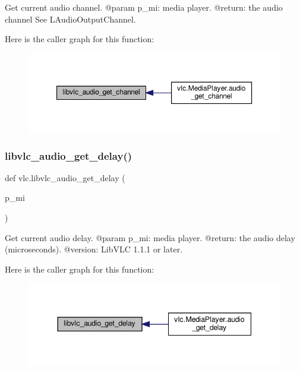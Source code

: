 \begin{DoxyVerb}Get current audio channel.
@param p_mi: media player.
@return: the audio channel See L{AudioOutputChannel}.
\end{DoxyVerb}
 Here is the caller graph for this function\+:
\nopagebreak
\begin{figure}[H]
\begin{center}
\leavevmode
\includegraphics[width=350pt]{namespacevlc_aaea673f933311af160dd682a91e0cd89_icgraph}
\end{center}
\end{figure}
\mbox{\label{namespacevlc_a62ec4fd04e704236c3bb48f2bada26e1}} 
\subsubsection{\texorpdfstring{libvlc\+\_\+audio\+\_\+get\+\_\+delay()}{libvlc\_audio\_get\_delay()}}
{\footnotesize\ttfamily def vlc.\+libvlc\+\_\+audio\+\_\+get\+\_\+delay (\begin{DoxyParamCaption}\item[{}]{p\+\_\+mi }\end{DoxyParamCaption})}

\begin{DoxyVerb}Get current audio delay.
@param p_mi: media player.
@return: the audio delay (microseconds).
@version: LibVLC 1.1.1 or later.
\end{DoxyVerb}
 Here is the caller graph for this function\+:
\nopagebreak
\begin{figure}[H]
\begin{center}
\leavevmode
\includegraphics[width=344pt]{namespacevlc_a62ec4fd04e704236c3bb48f2bada26e1_icgraph}
\end{center}
\end{figure}
\mbox{\label{namespacevlc_a4cdfbd29f8712d56aed3fa83b76a1b56}} 
